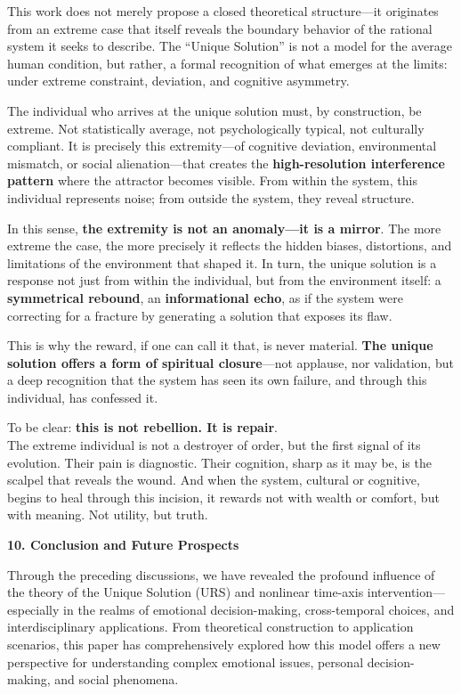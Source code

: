 \documentclass[
]{article}
\begin{document}
This work does not merely propose a closed theoretical structure---it
originates from an extreme case that itself reveals the boundary
behavior of the rational system it seeks to describe. The ``Unique
Solution'' is not a model for the average human condition, but rather, a
formal recognition of what emerges at the limits: under extreme
constraint, deviation, and cognitive asymmetry.

The individual who arrives at the unique solution must, by construction,
be extreme. Not statistically average, not psychologically typical, not
culturally compliant. It is precisely this extremity---of cognitive
deviation, environmental mismatch, or social alienation---that creates
the \textbf{high-resolution interference pattern} where the attractor
becomes visible. From within the system, this individual represents
noise; from outside the system, they reveal structure.

In this sense, \textbf{the extremity is not an anomaly---it is a
mirror}. The more extreme the case, the more precisely it reflects the
hidden biases, distortions, and limitations of the environment that
shaped it. In turn, the unique solution is a response not just from
within the individual, but from the environment itself: a
\textbf{symmetrical rebound}, an \textbf{informational echo}, as if the
system were correcting for a fracture by generating a solution that
exposes its flaw.

This is why the reward, if one can call it that, is never material.
\textbf{The unique solution offers a form of spiritual closure}---not
applause, nor validation, but a deep recognition that the system has
seen its own failure, and through this individual, has confessed it.

To be clear: \textbf{this is not rebellion. It is repair}.\\
The extreme individual is not a destroyer of order, but the first signal
of its evolution. Their pain is diagnostic. Their cognition, sharp as it
may be, is the scalpel that reveals the wound. And when the system,
cultural or cognitive, begins to heal through this incision, it rewards
not with wealth or comfort, but with meaning. Not utility, but truth.

\textbf{10. Conclusion and Future Prospects}

Through the preceding discussions, we have revealed the profound
influence of the theory of the Unique Solution (URS) and nonlinear
time-axis intervention---especially in the realms of emotional
decision-making, cross-temporal choices, and interdisciplinary
applications. From theoretical construction to application scenarios,
this paper has comprehensively explored how this model offers a new
perspective for understanding complex emotional issues, personal
decision-making, and social phenomena.
\end{document}
